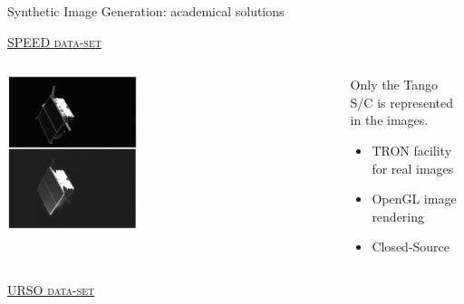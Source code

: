 \documentclass[10pt]{beamer}
\begin{document}
\begin{frame}{Synthetic Image Generation: academical solutions}

  \bigskip

  \begin{overlayarea}{\textwidth}{0.8\textheight}
  
  \hspace{0.6cm}  
  \textsc{\ul{SPEED data-set}}

  \begin{columns}[T,onlytextwidth]
    \hspace{0.6cm}
    \begin{column}{0.5\textwidth}
    \includegraphics[width=0.4\textwidth]{gfx/speed.eps}
    \end{column}
    \hspace{-1.5cm}
    \begin{column}{0.5\textwidth}
    
    \smallskip
    
     Only the Tango S/C is represented in the images.    

    \smallskip

    \begin{itemize}[label=$\bullet$]
      \item TRON facility for real images
      \item OpenGL image rendering
      \item Closed-Source
    \end{itemize}
    \end{column}
  \end{columns}

  \smallskip

  \hspace{0.6cm}
  \textsc{\ul{URSO data-set}}


\end{overlayarea}
\end{frame}
\end{document}
